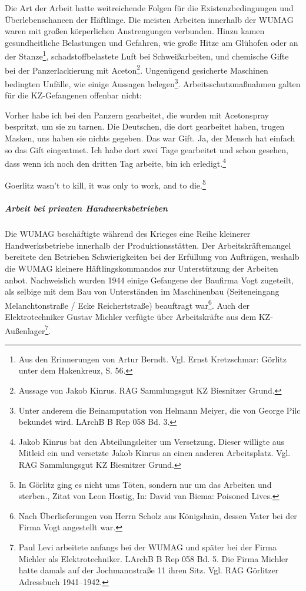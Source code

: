 Die Art der Arbeit hatte weitreichende Folgen für die Existenzbedingungen und Überlebenschancen der Häftlinge. Die meisten Arbeiten innerhalb der WUMAG waren mit großen körperlichen Anstrengungen verbunden. Hinzu kamen gesundheitliche Belastungen und Gefahren, wie große Hitze am Glühofen oder an der Stanze\footnote{Aus den Erinnerungen von Artur Berndt. Vgl. Ernst Kretzschmar: Görlitz unter dem Hakenkreuz, S. 56.}, schadstoffbelastete Luft bei Schweißarbeiten, und chemische Gifte bei der Panzerlackierung mit Aceton\footnote{Aussage von Jakob Kinrus. RAG Sammlungsgut KZ Biesnitzer Grund.}. Ungenügend gesicherte Maschinen bedingten Unfälle, wie einige Aussagen belegen\footnote{Unter anderem die Beinamputation von Helmann Meiyer, die von George Pilc bekundet wird. LArchB B Rep 058 Bd. 3.}. Arbeitsschutzmaßnahmen galten für die KZ-Gefangenen offenbar nicht:

\begin{leftbar}
Vorher habe ich bei den Panzern gearbeitet, die wurden mit Acetonspray bespritzt, um sie zu tarnen. Die Deutschen, die dort gearbeitet haben, trugen Masken, uns haben sie nichts gegeben. Das war Gift. Ja, der Mensch hat einfach so das Gift eingeatmet. Ich habe dort zwei Tage gearbeitet und schon gesehen, dass wenn ich noch den dritten Tag arbeite, bin ich erledigt.\footnote{Jakob Kinrus bat den Abteilungsleiter um Versetzung. Dieser willigte aus Mitleid ein und versetzte Jakob Kinrus an einen anderen Arbeitsplatz. Vgl. RAG Sammlungsgut KZ Biesnitzer Grund.}
\end{leftbar}

\begin{leftbar}
Goerlitz wasn't to kill, it was only to work, and to die.\footnote{\glqq In Görlitz ging es nicht ums Töten, sondern nur um das Arbeiten und sterben.\grqq, Zitat von Leon Hostig, In: David van Biema: \glqq Poisoned Lives\grqq.}
\end{leftbar}

\subparagraph{Arbeit bei privaten Handwerksbetrieben}
Die WUMAG beschäftigte\label{michel} während des Krieges eine Reihe kleinerer Handwerksbetriebe innerhalb der Produktionsstätten. Der Arbeitskräftemangel bereitete den Betrieben Schwierigkeiten bei der Erfüllung von Aufträgen, weshalb die WUMAG kleinere Häftlingskommandos zur Unterstützung der Arbeiten anbot. Nachweislich wurden 1944 einige Gefangene der Baufirma Vogt zugeteilt, als selbige mit dem Bau von Unterständen im Maschinenbau (Seiteneingang Melanchtonstraße / Ecke Reichertstraße) beauftragt war\footnote{Nach Überlieferungen von Herrn Scholz aus Königshain, dessen Vater bei der Firma Vogt angestellt war.}. Auch der Elektrotechniker Gustav Michler verfügte über Arbeitskräfte aus dem KZ-Außenlager\footnote{Paul Levi arbeitete anfangs bei der WUMAG und später bei der Firma Michler als Elektrotechniker. LArchB B Rep 058 Bd. 5. Die Firma Michler hatte damals auf der Jochmannstraße 11 ihren Sitz. Vgl. RAG Görlitzer Adressbuch 1941--1942.}.

